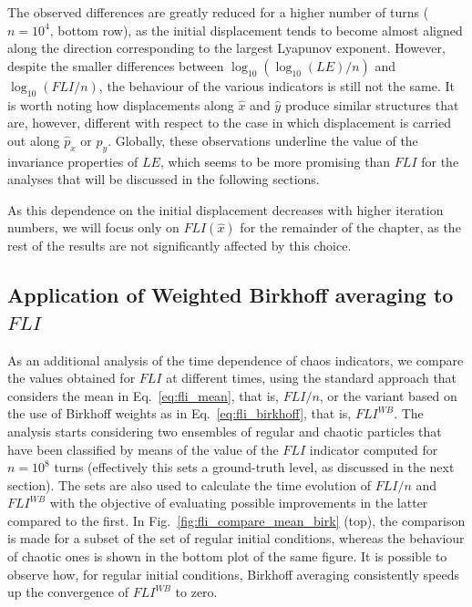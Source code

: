 The observed differences are greatly reduced for a higher number of turns ($n=10^4$, bottom row), as the initial displacement tends to become almost aligned along the direction corresponding to the largest Lyapunov exponent. However, despite the smaller differences between $\log_{10}(\log_{10}(LE)/n)$ and $\log_{10}(FLI/n)$, the behaviour of the various indicators is still not the same. It is worth noting how displacements along $\hat{x}$ and $\hat{y}$ produce similar structures that are, however, different with respect to the case in which displacement is carried out along $\hat{p}_x$ or $\hat{p}_y$. Globally, these observations underline the value of the invariance properties of $LE$, which seems to be more promising than $FLI$ for the analyses that will be discussed in the following sections.

As this dependence on the initial displacement decreases with higher iteration numbers, we will focus only on $FLI(\hat{x})$ for the remainder of the chapter, as the rest of the results are not significantly affected by this choice.

%
\subsection{Application of Weighted Birkhoff averaging to $FLI$}\label{subsec:dyn:FLI:WB}
%
As an additional analysis of the time dependence of chaos indicators, we compare the values obtained for $FLI$ at different times, using the standard approach that considers the mean in Eq.~\eqref{eq:fli_mean}, that is, $FLI/n$, or the variant based on the use of Birkhoff weights as in Eq.~\eqref{eq:fli_birkhoff}, that is, $FLI^{WB}$. The analysis starts considering two ensembles of regular and chaotic particles that have been classified by means of the value of the $FLI$ indicator computed for $n=10^8$ turns (effectively this sets a ground-truth level, as discussed in the next section). The sets are also used to calculate the time evolution of $FLI/n$ and $FLI^{WB}$ with the objective of evaluating possible improvements in the latter compared to the first. In Fig.~\ref{fig:fli_compare_mean_birk} (top), the comparison is made for a subset of the set of regular initial conditions, whereas the behaviour of chaotic ones is shown in the bottom plot of the same figure. It is possible to observe how, for regular initial conditions, Birkhoff averaging consistently speeds up the convergence of $FLI^{WB}$ to zero.

